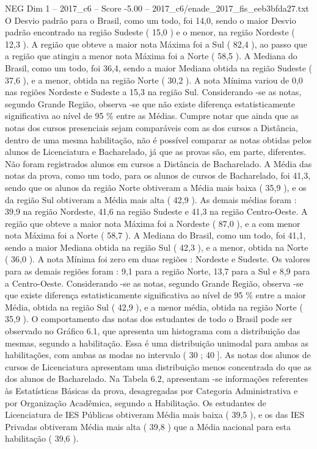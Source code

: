 \begin{textsample}{NEG Dim 1 – 2017\_c6 – Score -5.00 – 2017\_c6/enade\_2017\_fis\_eeb3bfda27.txt}
O Desvio padrão para o Brasil, como um todo, foi 14,0, sendo o maior Desvio padrão encontrado na região Sudeste ( 15,0 ) e o menor, na região Nordeste ( 12,3 ).
A região que obteve a maior nota Máxima foi a Sul ( 82,4 ), ao passo que a região que atingiu a menor nota Máxima foi a Norte ( 58,5 ).
A Mediana do Brasil, como um todo, foi 36,4, sendo a maior Mediana obtida na região Sudeste ( 37,6 ), e a menor, obtida na região Norte ( 30,2 ).
A nota Mínima variou de 0,0 nas regiões Nordeste e Sudeste a 15,3 na região Sul.
Considerando -se as notas, segundo Grande Região, observa -se que não existe diferença estatisticamente significativa ao nível de 95 \% entre as Médias.
Cumpre notar que ainda que as notas dos cursos presenciais sejam comparáveis com as dos cursos a Distância, dentro de uma mesma habilitação, não é possível comparar as notas obtidas pelos alunos de Licenciatura e Bacharelado, já que as provas são, em parte, diferentes.
Não foram registrados alunos em cursos a Distância de Bacharelado.
A Média das notas da prova, como um todo, para os alunos de cursos de Bacharelado, foi 41,3, sendo que os alunos da região Norte obtiveram a Média mais baixa ( 35,9 ), e os da região Sul obtiveram a Média mais alta ( 42,9 ).
As demais médias foram : 39,9 na região Nordeste, 41,6 na região Sudeste e 41,3 na região Centro-Oeste.
A região que obteve a maior nota Máxima foi a Nordeste ( 87,0 ), e a com menor nota Máxima foi a Norte ( 58,7 ).
A Mediana do Brasil, como um todo, foi 41,1, sendo a maior Mediana obtida na região Sul ( 42,3 ), e a menor, obtida na Norte ( 36,0 ).
A nota Mínima foi zero em duas regiões : Nordeste e Sudeste.
Os valores para as demais regiões foram : 9,1 para a região Norte, 13,7 para a Sul e 8,9 para a Centro-Oeste.
Considerando -se as notas, segundo Grande Região, observa -se que existe diferença estatisticamente significativa ao nível de 95 \% entre a maior Média, obtida na região Sul ( 42,9 ), e a menor média, obtida na região Norte ( 35,9 ).
O comportamento das notas dos estudantes de todo o Brasil pode ser observado no Gráfico 6.1, que apresenta um histograma com a distribuição das mesmas, segundo a habilitação.
Essa é uma distribuição unimodal para ambas as habilitações, com ambas as modas no intervalo ( 30 ; 40 ].
As notas dos alunos de cursos de Licenciatura apresentam uma distribuição menos concentrada do que as dos alunos de Bacharelado.
Na Tabela 6.2, apresentam -se informações referentes às Estatísticas Básicas da prova, desagregadas por Categoria Administrativa e por Organização Acadêmica, segundo a Habilitação.
Os estudantes de Licenciatura de IES Públicas obtiveram Média mais baixa ( 39,5 ), e os das IES Privadas obtiveram Média mais alta ( 39,8 ) que a Média nacional para esta habilitação ( 39,6 ).

\end{textsample}
